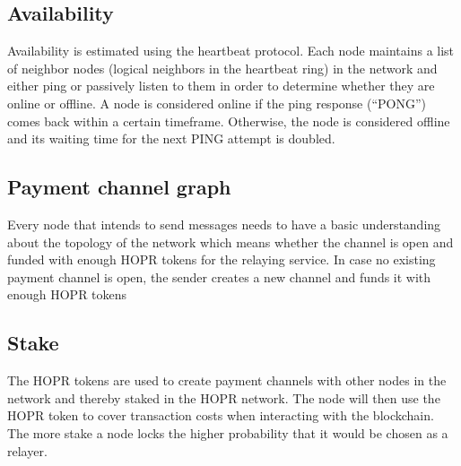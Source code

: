 \subsection{Availability}
Availability is estimated using the heartbeat protocol.
Each node maintains a list of neighbor nodes (logical neighbors in the heartbeat ring) in the network and either ping or passively listen to them in order to determine whether they are online or offline.
A node is considered online if the ping response (“PONG”) comes back within a certain timeframe. Otherwise, the node is considered offline and its waiting time for the next PING attempt is doubled.


\subsection{Payment channel graph}
Every node that intends to send messages needs to have a basic understanding about the topology of the network which means whether the channel is open and funded with enough HOPR tokens for the relaying service. In case no existing payment channel is open, the sender creates a new channel and funds it with enough HOPR tokens

\subsection{Stake}
The HOPR tokens are used to create payment channels with other nodes in the network and thereby staked in the HOPR network. The node will then use the HOPR token to cover transaction costs when interacting with the blockchain. The more stake a node locks the higher probability that it would be chosen as a relayer.

